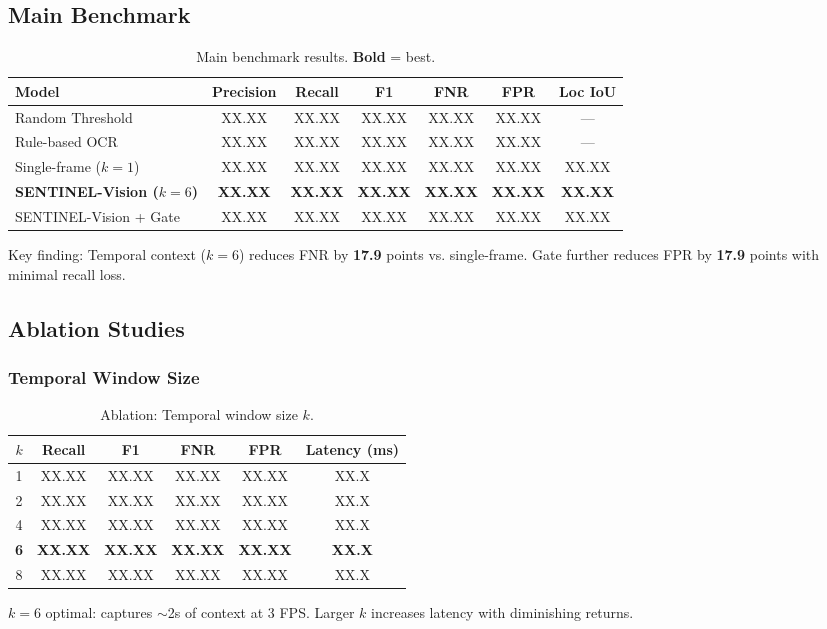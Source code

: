 \documentclass[11pt,a4paper]{article}
\begin{document}
\subsection{Main Benchmark}
\begin{table}[H]
\centering
\caption{Main benchmark results. \textbf{Bold} = best.}
\label{tab:main_benchmark}
\begin{tabular}{lcccccc}
\toprule
Model & Precision & Recall & F1 & \textbf{FNR} & FPR & Loc IoU \\
\midrule
Random Threshold & XX.XX & XX.XX & XX.XX & XX.XX & XX.XX & --- \\
Rule-based OCR & XX.XX & XX.XX & XX.XX & XX.XX & XX.XX & --- \\
Single-frame ($k=1$) & XX.XX & XX.XX & XX.XX & XX.XX & XX.XX & XX.XX \\
\textbf{SENTINEL-Vision ($k=6$)} & \textbf{XX.XX} & \textbf{XX.XX} & \textbf{XX.XX} & \textbf{XX.XX} & \textbf{XX.XX} & \textbf{XX.XX} \\
SENTINEL-Vision + Gate & XX.XX & XX.XX & XX.XX & XX.XX & XX.XX & XX.XX \\
\bottomrule
\end{tabular}
\end{table}

Key finding: Temporal context ($k=6$) reduces FNR by \textbf{17.9} points vs. single-frame. Gate further reduces FPR by \textbf{17.9} points with minimal recall loss.

\subsection{Ablation Studies}
\subsubsection{Temporal Window Size}
\begin{table}[H]
\centering
\caption{Ablation: Temporal window size $k$.}
\label{tab:ablation_window}
\begin{tabular}{cccccc}
\toprule
$k$ & Recall & F1 & FNR & FPR & Latency (ms) \\
\midrule
1 & XX.XX & XX.XX & XX.XX & XX.XX & XX.X \\
2 & XX.XX & XX.XX & XX.XX & XX.XX & XX.X \\
4 & XX.XX & XX.XX & XX.XX & XX.XX & XX.X \\
\textbf{6} & \textbf{XX.XX} & \textbf{XX.XX} & \textbf{XX.XX} & \textbf{XX.XX} & \textbf{XX.X} \\
8 & XX.XX & XX.XX & XX.XX & XX.XX & XX.X \\
\bottomrule
\end{tabular}
\end{table}
$k=6$ optimal: captures $\sim$2s of context at 3 FPS. Larger $k$ increases latency with diminishing returns.
\end{document}
